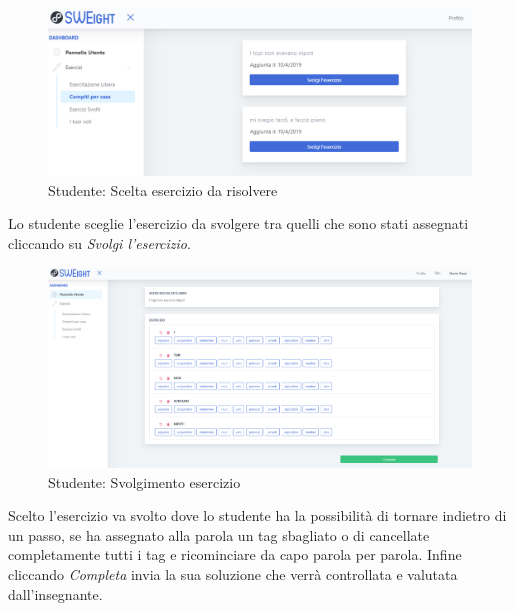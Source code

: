         	\begin{figure}[H]
            	\centering
            	\includegraphics[width=17cm]{sez/img/studente/compitopercasa.PNG} 
            	\caption{Studente: Scelta esercizio da risolvere}\label{fig:1}
        	\end{figure}

		  Lo studente sceglie l'esercizio da svolgere tra quelli che sono stati assegnati cliccando su \textit{Svolgi l'esercizio}.   
       
        	\begin{figure}[H]
            	\centering
            	\includegraphics[width=17cm]{sez/img/studente/svolgimentoesercizio.PNG} 
            	\caption{Studente: Svolgimento esercizio}\label{fig:1}
        	\end{figure}   
           Scelto l'esercizio va svolto dove lo studente ha la  possibilità di tornare indietro di un passo, se ha assegnato alla parola un tag sbagliato o di cancellate completamente tutti i tag e ricominciare da capo parola per parola. Infine cliccando \textit{Completa} invia la sua soluzione che verrà controllata e valutata dall'insegnante.
        
        
        
        
